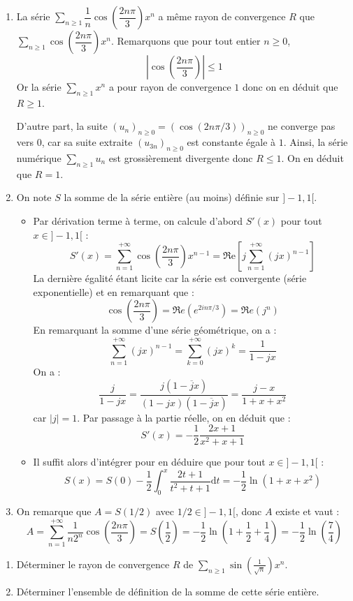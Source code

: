 \documentclass[a4paper,twoside,french,11pt]{VcCours}
\newcommand{\dt}{\text{d}t}
\newcommand{\Sum}[2]{\sum_{#1}^{#2}}
\begin{document}
\begin{enumerate}
\item La série $\Sum{n \geq 1}{} \dfrac{1}{n}\cos\left(\dfrac{2n\pi}{3}\right)x^n$ a même rayon de convergence $R$ que $\Sum{n \geq 1}{} \cos\left(\dfrac{2n\pi}{3}\right)x^n$. Remarquons que pour tout entier $n \geq 0$,
\[
 \left\vert \cos\left(\dfrac{2n\pi}{3}\right)\right\vert\leq 1
\]
Or la série $\Sum{n \geq 1}{} x^n$ a pour rayon de convergence $1$ donc on en déduit que $R\geq 1$.


D'autre part, la suite $(u_n)_{n \geq 0}=\left(\cos\left(2n\pi/3\right)\right)_{n \geq 0}$ ne converge pas vers $0$, car sa suite extraite $(u_{3n})_{n \geq 0}$ est constante égale à $1$. Ainsi, la série numérique $\Sum{n \geq 1}{} u_n$ est grossièrement divergente donc $R\leq 1$. On en déduit que $R=1$.
\item On note $S$ la somme de la série entière (au moins) définie sur $]-1,1[$.
\begin{itemize}
\item Par dérivation terme à terme, on calcule d'abord $S'(x)$ pour tout $x\in ]-1,1[$ : 
$$ S'(x)  = \sum_{n=1}^{+\infty}\cos\left(\dfrac{2n\pi}{3}\right)x^{n-1} = \Re\mathrm{e}\left[j\sum_{n=1}^{+\infty}(jx)^{n-1}\right]$$
La dernière égalité étant licite car la série est convergente (série exponentielle) et en remarquant que :
$$ \cos\left(\dfrac{2n\pi}{3}\right) = \Re e (e^{2i n \pi/3}) = \Re e (j^n)$$
En remarquant la somme d'une série géométrique, on a :
$$ \sum_{n=1}^{+\infty}(jx)^{n-1} = \sum_{k=0}^{+\infty}(jx)^{k} = \dfrac{1}{1-jx}$$
On a :
$$ \dfrac{j}{1-jx} =  \dfrac{j(1-\overline{j}x)}{(1-jx)(1-\overline{j}x)} =\dfrac{j-x}{1+x+x^2}$$
car $\vert j \vert =1$. Par passage à la partie réelle, on en déduit que :
$$S'(x)  = -\dfrac{1}{2}\dfrac{2x+1}{x^2+x+1}$$

\item Il suffit alors d'intégrer pour en déduire que pour tout $x\in ]-1,1[$ :  
$$ S(x)=S(0)-\dfrac{1}{2}\int_0^x\dfrac{2t+1}{t^2+t+1} \dt=-\dfrac{1}{2}\ln(1+x+x^2)$$

\end{itemize}
\item On remarque que $A=S(1/2)$ avec $1/2\in ]-1,1[$, donc $A$ existe et vaut : 
\[
A=\sum_{n=1}^{+\infty}\dfrac{1}{n2^n}\cos\left(\dfrac{2n\pi}{3}\right)=S\left(\dfrac{1}{2}\right)=-\dfrac{1}{2}\ln\left(1+\dfrac{1}{2}+\dfrac{1}{4}\right)=-\dfrac{1}{2}\ln\left(\dfrac{7}{4}\right)
\]
\end{enumerate}

\begin{Exercice}{} \begin{enumerate}
\item Déterminer le rayon de convergence $R$ de $\Sum{n \geq 1}{} \sin \left( \frac{1}{\sqrt{n}} \right) x^n$.
\item Déterminer l'ensemble de définition de la somme de cette série entière.
\end{enumerate}
\end{Exercice}
\end{document}
